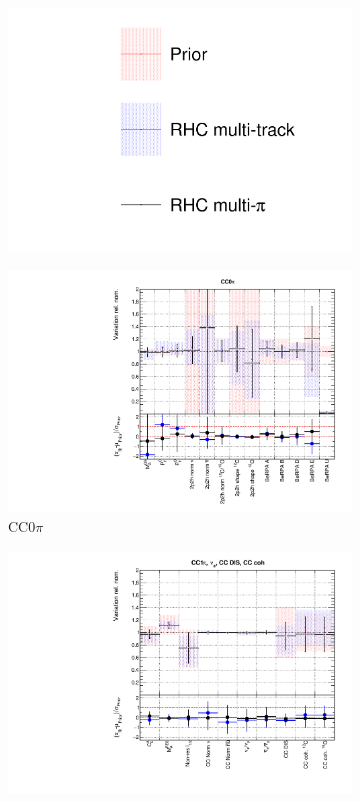 \begin{figure}[t]
\centering
\begin{subfigure}{0.95\textwidth}
  \centering
  \includegraphics[width=0.25\linewidth]{figs/rhcmpasmv_leg}	
\end{subfigure}
\begin{subfigure}{0.49\textwidth}
  \centering
  \includegraphics[width=0.95\linewidth]{figs/rhcmpasmvxsec1}
  \caption{CC0$\pi$}
\end{subfigure}
\begin{subfigure}{0.49\textwidth}
  \centering
  \includegraphics[width=0.95\linewidth]{figs/rhcmpasmvxsec2}

\end{subfigure}
\end{figure}
